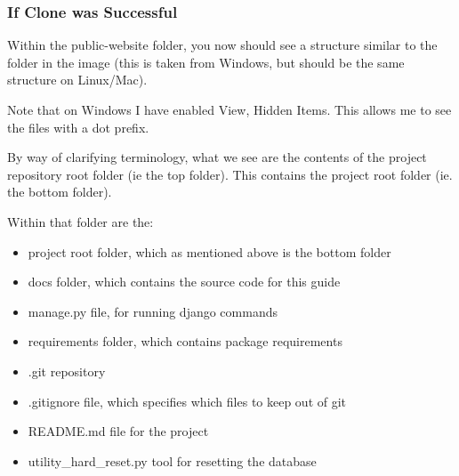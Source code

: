 \documentclass[letterpaper,10pt,english]{sphinxmanual}
\begin{document}
\begin{sphinxVerbatim}[commandchars=\\\{\}]
  
\end{sphinxVerbatim}


\subsubsection{If Clone was Successful}
\label{\detokenize{guide/02_download-project:if-clone-was-successful}}
Within the public-website folder, you now should see a structure similar to the folder in the image (this is taken from Windows, but should be the same structure on Linux/Mac).


Note that on Windows I have enabled View, Hidden Items. This allows me to see the files with a dot prefix.

By way of clarifying terminology, what we see are the contents of the project repository root folder (ie the top  folder).
This contains the project root folder (ie. the bottom  folder).

Within that folder are the:
\begin{itemize}
\item {} 
project root folder, which as mentioned above is the bottom  folder

\item {} 
docs folder, which contains the source code for this guide

\item {} 
manage.py file, for running django commands

\item {} 
requirements folder, which contains package requirements

\item {} 
.git repository

\item {} 
.gitignore file, which specifies which files to keep out of git

\item {} 
README.md file for the project

\item {} 
utility\_hard\_reset.py tool for resetting the database

\end{itemize}
\end{document}
